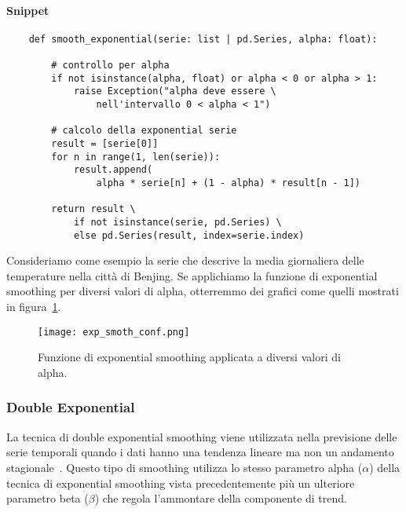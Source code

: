 \paragraph*{Snippet}
\begin{verbatim}
    def smooth_exponential(serie: list | pd.Series, alpha: float):

        # controllo per alpha
        if not isinstance(alpha, float) or alpha < 0 or alpha > 1:
            raise Exception("alpha deve essere \
                nell'intervallo 0 < alpha < 1")

        # calcolo della exponential serie
        result = [serie[0]]
        for n in range(1, len(serie)):
            result.append(
                alpha * serie[n] + (1 - alpha) * result[n - 1])

        return result \
            if not isinstance(serie, pd.Series) \
            else pd.Series(result, index=serie.index)
\end{verbatim}

\begin{esempio}
    Consideriamo come esempio la serie che descrive la media giornaliera delle temperature
    nella città di Benjing. Se applichiamo la funzione di exponential smoothing per diversi
    valori di alpha, otterremmo dei grafici come quelli mostrati in figura~\ref*{fig:exp_smoot}.
    
    \begin{figure}[H]
        \centering
        \texttt{[image: exp\_smoth\_conf.png]}
        \caption{Funzione di exponential smoothing applicata a diversi valori di alpha.}
        \label{fig:exp_smoot}
    \end{figure}

\end{esempio}


\subsubsection{Double Exponential}
La tecnica di double exponential smoothing viene utilizzata nella previsione delle 
serie temporali quando i dati hanno una tendenza lineare ma non un andamento stagionale~\cite{si:dexp_smot}.
Questo tipo di smoothing utilizza lo stesso parametro alpha ($\alpha$) della tecnica di exponential
smoothing vista precedentemente più un ulteriore parametro beta ($\beta$) che regola l'ammontare
della componente di trend.

